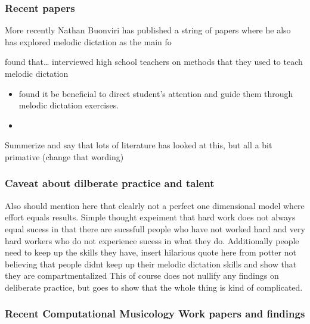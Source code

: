 \documentclass[]{book}
\providecommand{\tightlist}{%
  \setlength{\itemsep}{0pt}\setlength{\parskip}{0pt}}
\theoremstyle{definition}
\theoremstyle{definition}
\theoremstyle{definition}
\theoremstyle{remark}
\begin{document}
\hypertarget{recent-papers}{%
\subsubsection{Recent papers}\label{recent-papers}}

More recently Nathan Buonviri has published a string of papers where he
also has explored melodic dictation as the main fo

\citet{buonviriExplorationUndergraduateMusic2014} found that\ldots{}
\citet{paneyTeachingMelodicDictation2014} interviewed high school
teachers on methods that they used to teach melodic dictation
\citet{buonviriMelodicDictationInstruction2015}
\citet{buonviriEffectsMusicNotation2015}
\citet{buonviriEffectsPreparatorySinging2015}

\begin{itemize}
\tightlist
\item
  \citep{paneyEffectDirectingAttention2016} found it be beneficial to
  direct student's attention and guide them through melodic dictation
  exercises.
\item
  \citet{buonviriEffectsTwoListening2017}
\end{itemize}

Summerize and say that lots of literature has looked at this, but all a
bit primative (change that wording)

\hypertarget{caveat-about-dilberate-practice-and-talent}{%
\subsubsection{Caveat about dilberate practice and
talent}\label{caveat-about-dilberate-practice-and-talent}}

Also should mention here that clealrly not a perfect one dimensional
model where effort equals results. Simple thought expeiment that hard
work does not always equal sucess in that there are sucssfull people who
have not worked hard and very hard workers who do not experience sucess
in what they do. Additionally people need to keep up the skills they
have, insert hilarious quote here from potter not believing that people
didnt keep up their melodic dictation skills and show that they are
compartmentalized \citep{potterIdentifyingSucessfulDictation1990} This
of course does not nullify any findings on deliberate practice, but goes
to show that the whole thing is kind of complicated.

\hypertarget{recent-computational-musicology-work-papers-and-findings}{%
\subsubsection{Recent Computational Musicology Work papers and
findings}\label{recent-computational-musicology-work-papers-and-findings}}
\end{document}
